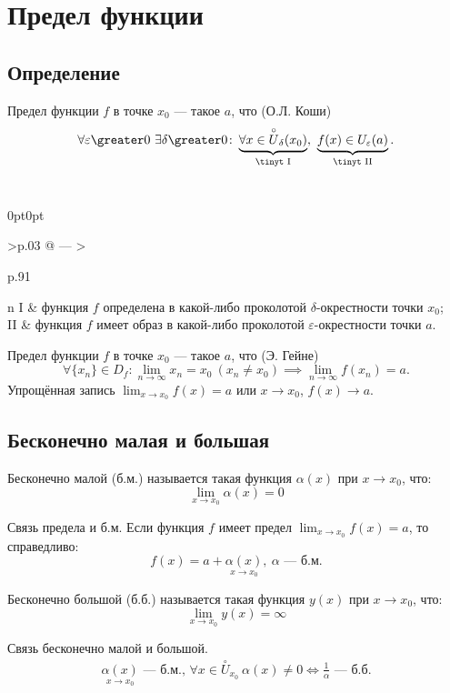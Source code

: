 \section{Предел функции}

\subsection{Определение}

{\bold Предел} функции $f$ в точке $x_0$ --- такое $a$, что {\ital\color{desc} (О.Л. Коши)}
$$\forall\varepsilon\greater 0\ \exists\delta\greater 0\colon\underbrace{
\forall x\in\overset{\circ}{U}_\delta(x_0)}_{\text{\tinyt I}},\ \underbrace{f(x)\in U_\varepsilon(a)}_{\text{\tinyt II}}.$$\\
\begin{tabularc}{0pt}{0pt}{>{\raggedleft\arraybackslash}p{.03\linewidth} @{ --- } 
>{\raggedright\arraybackslash}p{.91\linewidth}}{n}
I & функция $f$ определена в какой-либо проколотой $\delta$-окрестности точки $x_0$;
\\[18pt]
II & функция $f$ имеет образ в какой-либо проколотой $\varepsilon$-окрестности точки 
$a$.  
\end{tabularc}

{\bold Предел} функции $f$ в точке $x_0$ --- такое
$a$, что {\ital\color{desc} (Э. Гейне)}
$$\forall\{x_n\}\in D_f\colon\lim_{n\to\infty}x_n=x_0\ (x_n\neq x_0)\implies\lim_{n\to
\infty}f(x_n)=a.$$
Упрощённая запись $\lim_{x\to x_0}f(x)=a$ или $x\to x_0$, $f(x)\to a$.

\subsection{Бесконечно малая и большая}

{\bold Бесконечно малой} {\ital\color{desc}(б.м.)} называется такая функция $\alpha(x)$ при $x\to x_0$, что:
$$\lim_{x\to x_0}\alpha(x)=0$$
\begin{theorem}
{\bold Связь предела и б.м.} Если функция $f$ имеет предел $\lim_{x\to x_0}f(x)=a$, то справедливо:
$$f(x)=a+\underset{x\to x_0}{\alpha(x)},\ \alpha\text{ --- б.м.}$$
\end{theorem}

{\bold Бесконечно большой} {\ital\color{desc}(б.б.)} называется такая функция $y(x)$ при $x\to x_0$, что:
$$\lim_{x\to x_0}y(x)=\infty$$
\begin{theorem}
{\bold Связь бесконечно малой и большой.}
\begin{align*}
\underset{x\to x_0}{\alpha(x)}\text{ --- б.м., }\forall x\in\overset{\circ}{U}_{x_0}\ \alpha(x)\neq 0\iff\frac{1}{\alpha}\text{ --- б.б.}
\end{align*}
\end{theorem}

